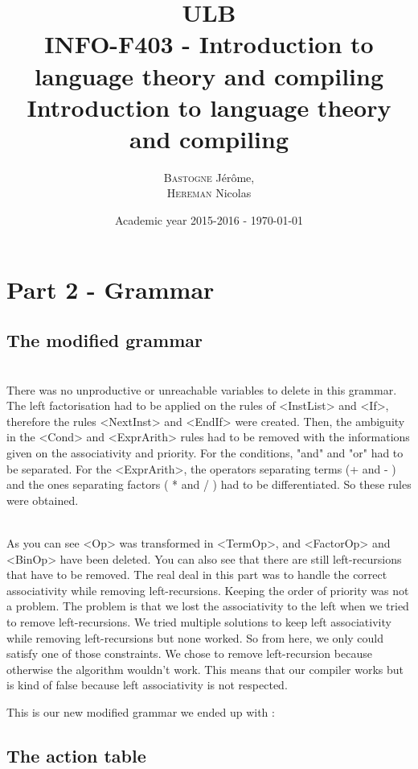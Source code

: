\documentclass[a4paper,10pt]{report}
\title{ULB\\
        INFO-F403 - Introduction to language theory and compiling \\
            Introduction to language theory and compiling}
\author{\textsc{Bastogne} Jérôme,\\
        \textsc{Hereman} Nicolas}
\date{Academic year 2015-2016 - \today}
\begin{document}
\maketitle
\clearpage


\chapter*{Part 2 - Grammar}

\section*{The modified grammar}

\hfill \\
There was no unproductive or unreachable variables to delete in this grammar. The left factorisation had to be applied on the rules of <InstList> and <If>, therefore the rules <NextInst> and <EndIf> were created. Then, the ambiguity in the <Cond> and <ExprArith> rules had to be removed with the informations given on the associativity and priority. For the conditions, "and" and "or" had to be separated. For the <ExprArith>, the operators separating terms (+ and - ) and the ones separating factors ( * and / ) had to be differentiated. So these rules were obtained.



\hfill \\
As you can see <Op> was transformed in <TermOp>, and <FactorOp> and <BinOp> have been deleted. You can also see that there are still left-recursions that have to be removed. The real deal in this part was to handle the correct associativity while removing left-recursions. Keeping the order of priority was not a problem. The problem is that we lost the associativity to the left when we tried to remove left-recursions. We tried multiple solutions to keep left associativity while removing left-recursions but none worked. So from here, we only could satisfy one of those constraints. We chose to remove left-recursion because otherwise the algorithm wouldn't work. This means that our compiler works but is kind of false because left associativity is not respected.

This is our new modified grammar we ended up with : \\




\section*{The action table}
\end{document}
